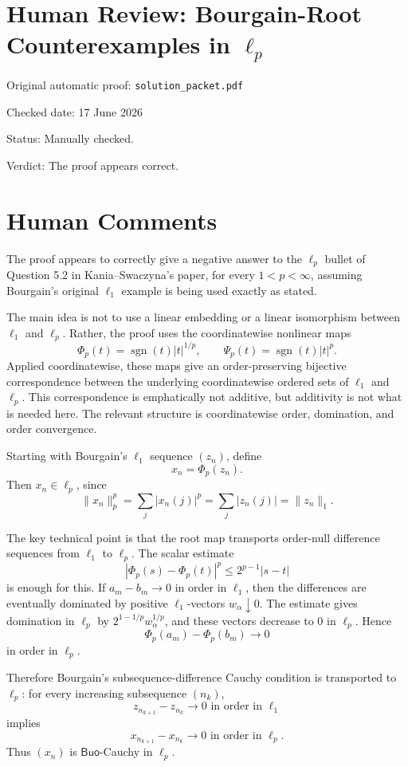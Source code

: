 \documentclass[11pt]{article}
\newcommand{\Buo}{\mathsf{Buo}}
\newcommand{\sgn}{\operatorname{sgn}}
\begin{document}
\section*{Human Review: Bourgain-Root Counterexamples in \texorpdfstring{$\ell_p$}{ell-p}}

\noindent Original automatic proof: \texttt{solution\_packet.pdf}

\noindent Checked date: 17 June 2026

\noindent Status: Manually checked.

\noindent Verdict: The proof appears correct.

\section*{Human Comments}

The proof appears to correctly give a negative answer to the \(\ell_p\) bullet of Question 5.2 in Kania--Swaczyna's paper, for every \(1<p<\infty\), assuming Bourgain's original \(\ell_1\) example is being used exactly as stated.

The main idea is not to use a linear embedding or a linear isomorphism between \(\ell_1\) and \(\ell_p\). Rather, the proof uses the coordinatewise nonlinear maps
\[
  \Phi_p(t)=\sgn(t)|t|^{1/p},
  \qquad
  \Psi_p(t)=\sgn(t)|t|^p.
\]
Applied coordinatewise, these maps give an order-preserving bijective correspondence between the underlying coordinatewise ordered sets of \(\ell_1\) and \(\ell_p\). This correspondence is emphatically not additive, but additivity is not what is needed here. The relevant structure is coordinatewise order, domination, and order convergence.

Starting with Bourgain's \(\ell_1\) sequence \((z_n)\), define
\[
  x_n=\Phi_p(z_n).
\]
Then \(x_n\in\ell_p\), since
\[
  \|x_n\|_p^p=\sum_j |x_n(j)|^p=\sum_j |z_n(j)|=\|z_n\|_1.
\]

The key technical point is that the root map transports order-null difference sequences from \(\ell_1\) to \(\ell_p\). The scalar estimate
\[
  |\Phi_p(s)-\Phi_p(t)|^p\leq 2^{p-1}|s-t|
\]
is enough for this. If \(a_m-b_m\to0\) in order in \(\ell_1\), then the differences are eventually dominated by positive \(\ell_1\)-vectors \(w_\alpha\downarrow0\). The estimate gives domination in \(\ell_p\) by \(2^{1-1/p}w_\alpha^{1/p}\), and these vectors decrease to \(0\) in \(\ell_p\). Hence
\[
  \Phi_p(a_m)-\Phi_p(b_m)\to0
\]
in order in \(\ell_p\).

Therefore Bourgain's subsequence-difference Cauchy condition is transported to \(\ell_p\): for every increasing subsequence \((n_k)\),
\[
  z_{n_{k+1}}-z_{n_k}\to0 \text{ in order in } \ell_1
\]
implies
\[
  x_{n_{k+1}}-x_{n_k}\to0 \text{ in order in } \ell_p.
\]
Thus \((x_n)\) is \(\Buo\)-Cauchy in \(\ell_p\).
\end{document}
